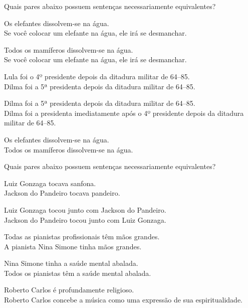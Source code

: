 \problempart Quais pares abaixo possuem sentenças necessariamente equivalentes?

\begin{earg}
\item Os elefantes dissolvem-se na água.	\\
	Se você colocar um elefante na água, ele irá se desmanchar.
\item Todos os mamíferos dissolvem-se na água. \\		
	Se você colocar um elefante na água, ele irá se desmanchar. 
\item Lula foi o 4º presidente depois da ditadura militar de 64--85. \\
	 Dilma foi a 5ª presidenta depois da ditadura militar de 64--85. 
\item Dilma foi a 5ª presidenta depois da ditadura militar de 64--85. \\
	  Dilma foi a presidenta imediatamente após o 4º presidente depois da ditadura militar de 64--85.
\item Os elefantes dissolvem-se na água. 	\\	
	Todos os mamíferos dissolvem-se na água. 
\end{earg}

\problempart Quais pares abaixo possuem sentenças necessariamente equivalentes?

\begin{earg}
\item Luiz Gonzaga tocava sanfona. \\
	Jackson do Pandeiro tocava pandeiro.

\item Luiz Gonzaga tocou junto com Jackson do Pandeiro. \\
	Jackson do Pandeiro tocou junto com Luiz Gonzaga.

\item Todas  as pianistas profissionais têm mãos grandes. \\
	A pianista Nina Simone tinha mãos grandes.

\item Nina Simone tinha a saúde mental abalada. \\
	Todos os pianistas têm a saúde mental abalada.

\item Roberto Carlos é profundamente religioso. \\
	Roberto Carlos concebe a música como uma expressão de sua espiritualidade.
\end{earg}


